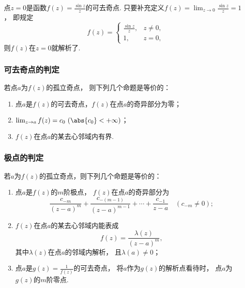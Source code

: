 \begin{example}
点\(z=0\)是函数\(f(z) = \frac{\sin z}{z}\)的可去奇点.
只要补充定义\(f(z) = \lim_{z\to0} \frac{\sin z}{z} = 1\)，
即规定\[
	f(z) = \left\{ \begin{array}{cc}
		\frac{\sin z}{z}, & z\neq0, \\
		1, & z=0,
	\end{array} \right.
\]
则\(f(z)\)在\(z=0\)就解析了.
\end{example}

\subsubsection{可去奇点的判定}
\begin{theorem}\label{theorem:解析函数的级数表示.可去奇点的特征}
若点\(a\)为\(f(z)\)的孤立奇点，
则下列几个命题是等价的：
\begin{enumerate}
	\item 点\(a\)是\(f(z)\)的可去奇点，\(f(z)\)在点\(a\)的奇异部分为零；
	\item \(\lim_{z \to a} f(z) = c_0\ (\abs{c_0} < +\infty)\)；
	\item \(f(z)\)在点\(a\)的某去心邻域内有界.
\end{enumerate}
\end{theorem}

\subsubsection{极点的判定}
\begin{theorem}\label{theorem:解析函数的级数表示.极点的特征}
若\(a\)为\(f(z)\)的孤立奇点，则下列几个命题是等价的：
\begin{enumerate}
	\item 点\(a\)是\(f(z)\)的\(m\)阶极点，
	\(f(z)\)在点\(a\)的奇异部分为\[
		\frac{c_{-m}}{(z-a)^m}
		+ \frac{c_{-(m-1)}}{(z-a)^{m-1}}
		+ \dotsb + \frac{c_{-1}}{z-a}
		\quad(c_{-m}\neq0);
	\]

	\item \(f(z)\)在点\(a\)的某去心邻域内能表成\[
		f(z) = \frac{\lambda(z)}{(z-a)^m},
	\]
	其中\(\lambda(z)\)在点\(a\)的邻域内解析，
	且\(\lambda(a)\neq0\)；

	\item 点\(a\)是\(g(z) = \frac{1}{f(z)}\)的可去奇点，
	将\(a\)作为\(g(z)\)的解析点看待时，
	点\(a\)为\(g(z)\)的\(m\)阶零点.
\end{enumerate}
\end{theorem}

